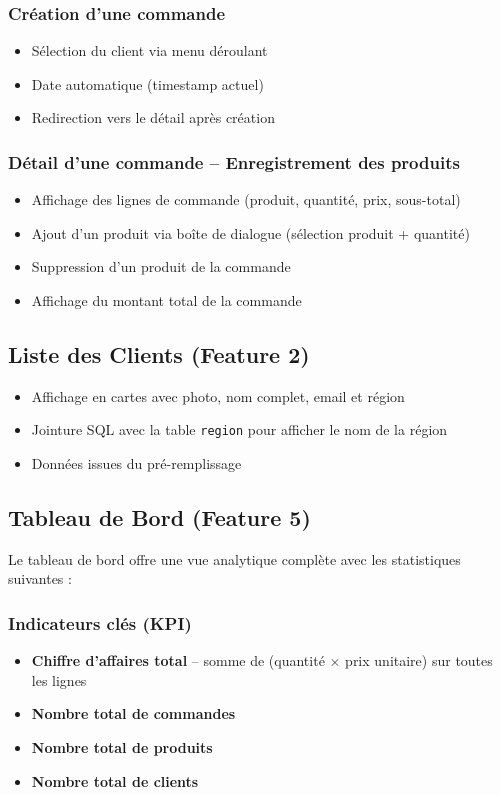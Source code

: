\documentclass[12pt,a4paper]{article}
\begin{document}
\subsubsection{Cr\'eation d'une commande}
\begin{itemize}
    \item S\'election du client via menu d\'eroulant
    \item Date automatique (timestamp actuel)
    \item Redirection vers le d\'etail apr\`es cr\'eation
\end{itemize}

\subsubsection{D\'etail d'une commande -- Enregistrement des produits}
\begin{itemize}
    \item Affichage des lignes de commande (produit, quantit\'e, prix, sous-total)
    \item Ajout d'un produit via bo\^ite de dialogue (s\'election produit + quantit\'e)
    \item Suppression d'un produit de la commande
    \item Affichage du montant total de la commande
\end{itemize}

\subsection{Liste des Clients (Feature 2)}

\begin{itemize}
    \item Affichage en cartes avec photo, nom complet, email et r\'egion
    \item Jointure SQL avec la table \texttt{region} pour afficher le nom de la r\'egion
    \item Donn\'ees issues du pr\'e-remplissage
\end{itemize}

\subsection{Tableau de Bord (Feature 5)}

Le tableau de bord offre une vue analytique compl\`ete avec les statistiques suivantes :

\subsubsection{Indicateurs cl\'es (KPI)}
\begin{itemize}
    \item \textbf{Chiffre d'affaires total} -- somme de (quantit\'e $\times$ prix unitaire) sur toutes les lignes
    \item \textbf{Nombre total de commandes}
    \item \textbf{Nombre total de produits}
    \item \textbf{Nombre total de clients}
\end{itemize}
\end{document}
